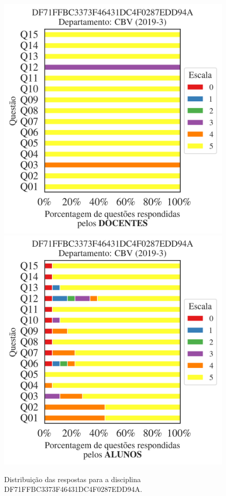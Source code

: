\documentclass[a4paper,10pt]{article}
\begin{document}
\begin{figure}[h]
\centering
\includegraphics[width=0.485\linewidth]{analise_disciplina_departamento_CBV_DF71FFBC3373F46431DC4F0287EDD94A_docentes.png}
\includegraphics[width=0.485\linewidth]{analise_disciplina_departamento_CBV_DF71FFBC3373F46431DC4F0287EDD94A_alunos.png}
\caption{\label{fig:analise_geral_departamento}                Distribuição das respostas para a disciplina DF71FFBC3373F46431DC4F0287EDD94A. }
\end{figure}
\end{document}
